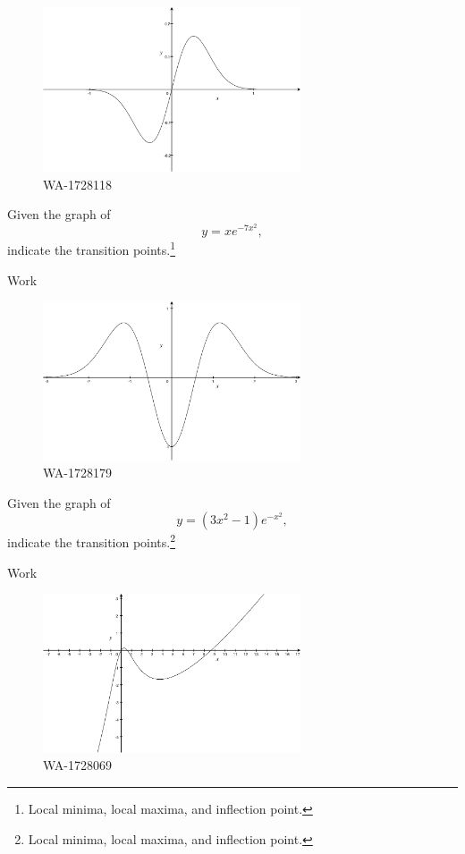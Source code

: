 \documentclass[12pt,addpoints, answers, fleqn]{exam}
\begin{document}
\begin{teacher}
\begin{questions}
\begin{figure}[htbp] %
   \centering
   \includegraphics[width=3in]{./graphics/1728118.pdf} 
   \caption{WA-1728118}
   \label{fig:1728118}
\end{figure}

Given the graph of
\[
y = x e^{-7x^2},
\]
indicate the transition points.\footnote{Local minima, local maxima, and inflection point.}

\begin{solution}
Work
\end{solution}

\question 	%

\begin{figure}[htbp] %
   \centering
   \includegraphics[width=3in]{./graphics/1728179.pdf} 
   \caption{WA-1728179}
   \label{fig:1728179}
\end{figure}

Given the graph of
\[ 
y = (3x^2 - 1)e^{-x^2},
\]
indicate the transition points.\footnote{Local minima, local maxima, and inflection point.}

\begin{solution}
Work
\end{solution}

\question 	%

\begin{figure}[htbp] %
   \centering
   \includegraphics[width=3in]{./graphics/1728069.pdf} 
   \caption{WA-1728069}
   \label{fig:1728069}
\end{figure}


\end{questions}
\end{teacher}
\end{document}
